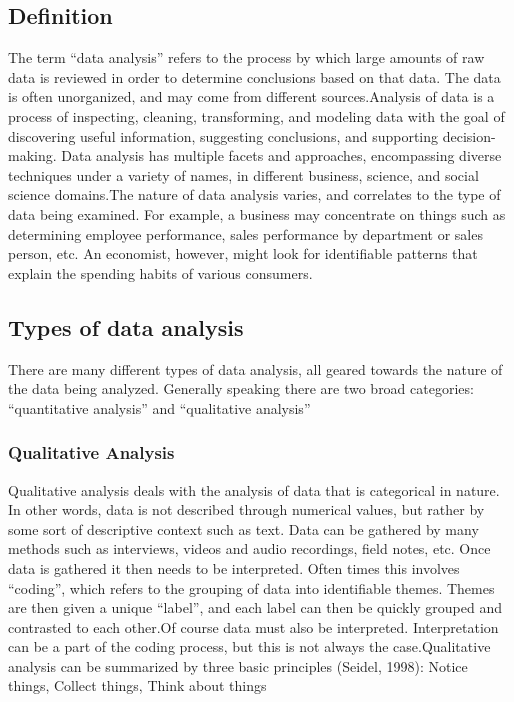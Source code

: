 \documentclass[a4paper,12pt,oneside]{report}
\begin{document}
{{\subsection{Definition}
{      The term “data analysis” refers to the process by which large amounts of raw data is reviewed in order to determine conclusions based on that data. The data is often unorganized, and may come from different sources.Analysis of data is a process of inspecting, cleaning, transforming, and modeling data with the goal of discovering useful information, suggesting conclusions, and supporting decision-making. Data analysis has multiple facets and approaches, encompassing diverse techniques under a variety of names, in different business, science, and social science domains.The nature of data analysis varies, and correlates to the type of data being examined. For example, a business may concentrate on things such as determining employee performance, sales performance by department or sales person, etc. An economist, however, might look for identifiable patterns that explain the spending habits of various consumers.}
\subsection{Types of data analysis }
{     There are many different types of data analysis, all geared towards the nature of the data being analyzed. Generally speaking there are two broad categories: “quantitative analysis” and “qualitative analysis”}
\subsubsection{Qualitative Analysis}
{    Qualitative analysis deals with the analysis of data that is categorical in nature. In other words, data is not described through numerical values, but rather by some sort of descriptive context such as text. Data can be gathered by many methods such as interviews, videos and audio recordings, field notes, etc.
Once data is gathered it then needs to be interpreted. Often times this involves “coding”, which refers to the grouping of data into identifiable themes. Themes are then given a unique “label”, and each label can then be quickly grouped and contrasted to each other.Of course data must also be interpreted. Interpretation can be a part of the coding process, but this is not always the case.Qualitative analysis can be summarized by three basic principles (Seidel, 1998):
Notice things, Collect things, Think about things}
}}
\end{document}
